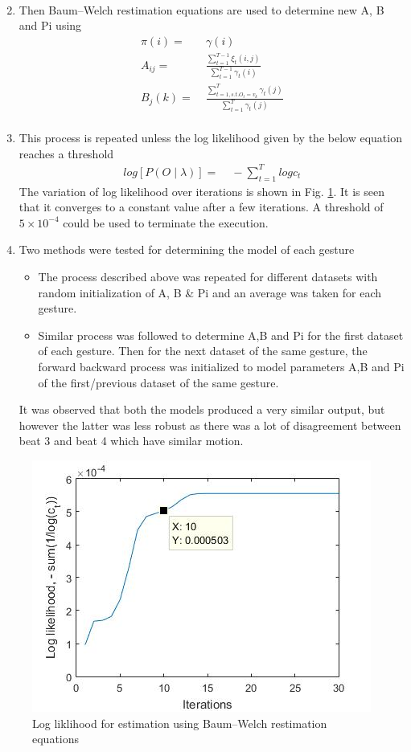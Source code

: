 \documentclass[fleqn,10pt]{SelfArx} %
\begin{document}
\begin{enumerate}
\begin{align*}
\end{align*}
\item Then Baum–Welch restimation equations are used to determine new A, B and Pi using
\begin{align*}
\pi(i) =&\; \gamma(i) \\
A_{ij} =&\; \frac{\sum_{t=1}^{T-1} \xi_t(i,j)}{\sum_{t=1}^{T-1} \gamma_t(i)} \\
B_j(k) =&\;  \frac{\sum_{t=1, s.t.O_t = v_k}^{T} \gamma_t(j)}{\sum_{t=1}^T \gamma_t(j)} \\
\end{align*}
\item This process is repeated unless the log likelihood given by the below equation reaches a threshold
\begin{align*}
log\left[P(O\mid \lambda)\right] =&\; - \sum_{t=1}^T log c_t
\end{align*}
The variation of log likelihood over iterations is shown in Fig. \ref{fig:conv}. It is seen that it converges to a constant value after a few iterations. A threshold of $5 \times 10^{-4}$ could be used to terminate the execution.
\item Two methods were tested for determining the model of each gesture
\begin{itemize}
\item The process described above was repeated for different datasets with random initialization of A, B \& Pi and an average was taken for each gesture.
\item Similar process was followed to determine A,B and Pi for the first dataset of each gesture. Then for the next dataset of the same gesture, the forward backward process was initialized to model parameters A,B and Pi of the first/previous dataset of the same gesture.
\end{itemize}
It was observed that both the models produced a very similar output, but however the latter was less robust as there was a lot of disagreement between beat 3 and beat 4 which have similar motion.
\end{enumerate}

\begin{figure}[hbtp]
\centering
\includegraphics[scale=0.5]{conv.jpg}
\caption{Log liklihood for estimation using Baum–Welch restimation equations}
\label{fig:conv}
\end{figure}
\end{document}
